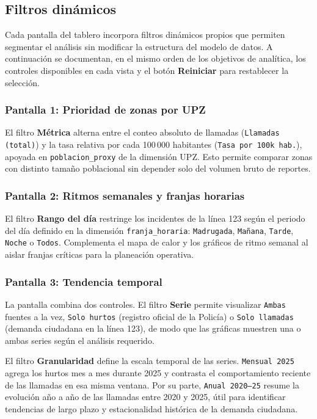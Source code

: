 \documentclass[12pt,letterpaper]{article}
\begin{document}
\subsection{Filtros dinámicos}

Cada pantalla del tablero incorpora filtros dinámicos propios que permiten segmentar el análisis sin modificar la estructura del modelo de datos. A continuación se documentan, en el mismo orden de los objetivos de analítica, los controles disponibles en cada vista y el botón \textbf{Reiniciar} para restablecer la selección.

\subsubsection{Pantalla 1: Prioridad de zonas por UPZ}

El filtro \textbf{Métrica} alterna entre el conteo absoluto de llamadas (\texttt{Llamadas (total)}) y la tasa relativa por cada 100\,000 habitantes (\texttt{Tasa por 100k hab.}), apoyada en \texttt{poblacion\_proxy} de la dimensión UPZ. Esto permite comparar zonas con distinto tamaño poblacional sin depender solo del volumen bruto de reportes.

\subsubsection{Pantalla 2: Ritmos semanales y franjas horarias}

El filtro \textbf{Rango del día} restringe los incidentes de la línea 123 según el periodo del día definido en la dimensión \texttt{franja\_horaria}: \texttt{Madrugada}, \texttt{Mañana}, \texttt{Tarde}, \texttt{Noche} o \texttt{Todos}. Complementa el mapa de calor y los gráficos de ritmo semanal al aislar franjas críticas para la planeación operativa.

\subsubsection{Pantalla 3: Tendencia temporal}

La pantalla combina dos controles. El filtro \textbf{Serie} permite visualizar \texttt{Ambas} fuentes a la vez, \texttt{Solo hurtos} (registro oficial de la Policía) o \texttt{Solo llamadas} (demanda ciudadana en la línea 123), de modo que las gráficas muestren una o ambas series según el análisis requerido.

El filtro \textbf{Granularidad} define la escala temporal de las series. \texttt{Mensual 2025} agrega los hurtos mes a mes durante 2025 y contrasta el comportamiento reciente de las llamadas en esa misma ventana. Por su parte, \texttt{Anual 2020--25} resume la evolución año a año de las llamadas entre 2020 y 2025, útil para identificar tendencias de largo plazo y estacionalidad histórica de la demanda ciudadana.
\end{document}
